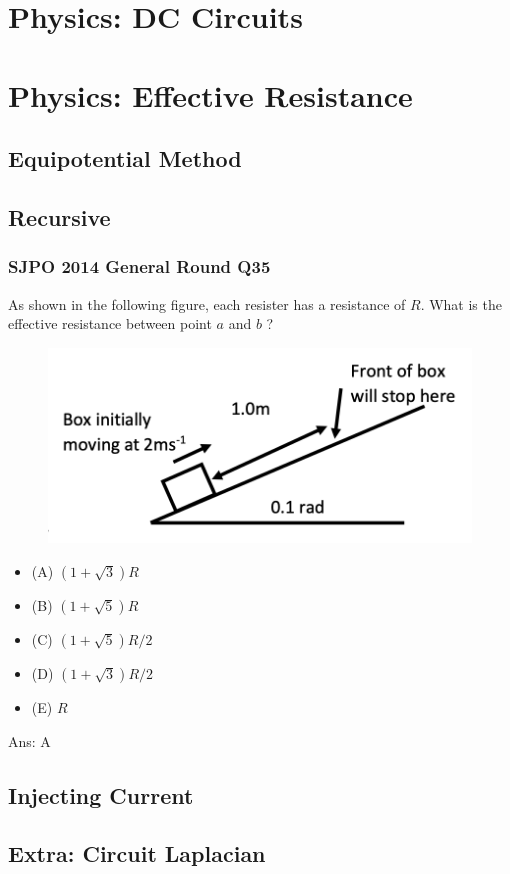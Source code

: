 \documentclass{article}
\begin{document}
\section{Physics: DC Circuits}
\section{Physics: Effective Resistance}
\subsection{Equipotential Method}
\subsection{Recursive}
\subsubsection{SJPO 2014 General Round Q35}
As shown in the following figure, each resister has a resistance of $R$. What is the effective resistance between point $a$ and $b$ ?
\begin{figure}
\includegraphics[width=1.0\linewidth]{images/sjpo2016q4.png}
\end{figure}
\begin{itemize}
\item[] (A) $(1+\sqrt{3}) R$
\item[] (B) $(1+\sqrt{5}) R$
\item[] (C) $(1+\sqrt{5}) R / 2$
\item[] (D) $(1+\sqrt{3}) R / 2$
\item[] (E) $R$
\end{itemize}
Ans: \ifpaper A \fi 
\subsection{Injecting Current}
\subsection{Extra: Circuit Laplacian}
\end{document}
